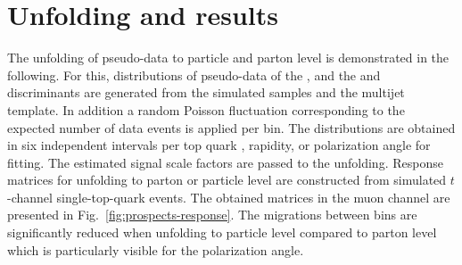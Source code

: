 
\section{Unfolding and results}

The unfolding of pseudo-data to particle and parton level is demonstrated in the following. For this, distributions of pseudo-data of the \mtw, and the \bdttt and \bdttch discriminants are generated from the simulated samples and the multijet template. In addition a random Poisson fluctuation corresponding to the expected number of data events is applied per bin. The distributions are obtained in six independent intervals per top quark \pt, rapidity, or polarization angle for fitting. The estimated signal scale factors are passed to the unfolding. Response matrices for unfolding to parton or particle level are constructed from simulated $t$-channel single-top-quark events. The obtained matrices in the muon channel are presented in Fig.~\ref{fig:prospects-response}. The migrations between bins are significantly reduced when unfolding to particle level compared to parton level which is particularly visible for the polarization angle.

